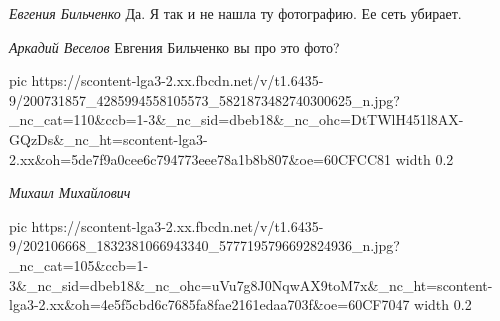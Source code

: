 \emph{Евгения Бильченко}
Да. Я так и не нашла ту фотографию. Ее сеть убирает.

\emph{Аркадий Веселов}
Евгения Бильченко вы про это фото?

\ifcmt
  pic https://scontent-lga3-2.xx.fbcdn.net/v/t1.6435-9/200731857_4285994558105573_5821873482740300625_n.jpg?_nc_cat=110&ccb=1-3&_nc_sid=dbeb18&_nc_ohc=DtTWlH451l8AX-GQzDs&_nc_ht=scontent-lga3-2.xx&oh=5de7f9a0cee6c794773eee78a1b8b807&oe=60CFCC81
  width 0.2
\fi

\emph{Михаил Михайлович}

\ifcmt
  pic https://scontent-lga3-2.xx.fbcdn.net/v/t1.6435-9/202106668_1832381066943340_5777195796692824936_n.jpg?_nc_cat=105&ccb=1-3&_nc_sid=dbeb18&_nc_ohc=uVu7g8J0NqwAX9toM7x&_nc_ht=scontent-lga3-2.xx&oh=4e5f5cbd6c7685fa8fae2161edaa703f&oe=60CF7047
  width 0.2
\fi

